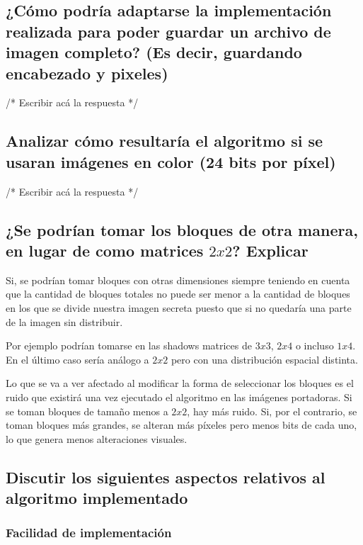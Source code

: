 \documentclass[11pt]{scrartcl} %
\begin{document}

\subsection{¿Cómo podría adaptarse la implementación realizada para poder guardar un archivo de imagen completo? (Es decir, guardando encabezado y pixeles)}

/* Escribir acá la respuesta */


\subsection{Analizar cómo resultaría el algoritmo si se usaran imágenes en color (24 bits por píxel)}

/* Escribir acá la respuesta */

\subsection{¿Se podrían tomar los bloques de otra manera, en lugar de como matrices $2x2$? Explicar}

Si, se podrían tomar bloques con otras dimensiones siempre teniendo en cuenta que la cantidad de bloques totales no puede ser menor a la cantidad de bloques en los que se divide nuestra imagen secreta puesto que si no quedaría una parte de la imagen sin distribuir. 

Por ejemplo podrían tomarse en las shadows matrices de $3x3$, $2x4$ o incluso $1x4$. En el último caso sería análogo a $2x2$ pero con una distribución espacial distinta.

Lo que se va a ver afectado al modificar la forma de seleccionar los bloques es el ruido que existirá una vez ejecutado el algoritmo en las imágenes portadoras. Si se toman bloques de tamaño menos a $2x2$, hay más ruido. Si, por el contrario, se toman bloques más grandes, se alteran más píxeles pero menos bits de cada uno, lo que genera menos alteraciones visuales.

\subsection{Discutir los siguientes aspectos relativos al algoritmo implementado}
\subsubsection{Facilidad de implementación}
\end{document}

